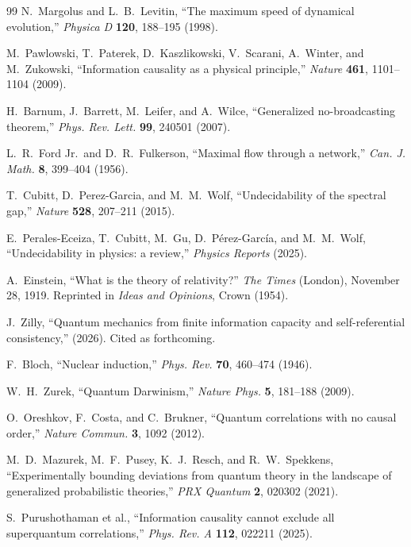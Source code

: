 \documentclass[12pt,a4paper]{article}
\theoremstyle{definition}
\theoremstyle{remark}
\begin{document}
\begin{thebibliography}{99}
N.~Margolus and L.~B.~Levitin, ``The maximum speed of dynamical evolution,'' \textit{Physica D} \textbf{120}, 188--195 (1998).

M.~Pawlowski, T.~Paterek, D.~Kaszlikowski, V.~Scarani, A.~Winter, and M.~Zukowski, ``Information causality as a physical principle,'' \textit{Nature} \textbf{461}, 1101--1104 (2009).

H.~Barnum, J.~Barrett, M.~Leifer, and A.~Wilce, ``Generalized no-broadcasting theorem,'' \textit{Phys. Rev. Lett.} \textbf{99}, 240501 (2007).

L.~R.~Ford Jr.\ and D.~R.~Fulkerson, ``Maximal flow through a network,'' \textit{Can. J. Math.} \textbf{8}, 399--404 (1956).

T.~Cubitt, D.~Perez-Garcia, and M.~M.~Wolf, ``Undecidability of the spectral gap,'' \textit{Nature} \textbf{528}, 207--211 (2015).

E.~Perales-Eceiza, T.~Cubitt, M.~Gu, D.~P\'erez-Garc\'ia, and M.~M.~Wolf, ``Undecidability in physics: a review,'' \textit{Physics Reports} (2025).

A.~Einstein, ``What is the theory of relativity?'' \textit{The Times} (London), November 28, 1919. Reprinted in \textit{Ideas and Opinions}, Crown (1954).

J.~Zilly, ``Quantum mechanics from finite information capacity and self-referential consistency,'' (2026). Cited as forthcoming.

F.~Bloch, ``Nuclear induction,'' \textit{Phys. Rev.} \textbf{70}, 460--474 (1946).

W.~H.~Zurek, ``Quantum Darwinism,'' \textit{Nature Phys.} \textbf{5}, 181--188 (2009).

O.~Oreshkov, F.~Costa, and C.~Brukner, ``Quantum correlations with no causal order,'' \textit{Nature Commun.} \textbf{3}, 1092 (2012).

M.~D.~Mazurek, M.~F.~Pusey, K.~J.~Resch, and R.~W.~Spekkens, ``Experimentally bounding deviations from quantum theory in the landscape of generalized probabilistic theories,'' \textit{PRX Quantum} \textbf{2}, 020302 (2021).

S.~Purushothaman et al., ``Information causality cannot exclude all superquantum correlations,'' \textit{Phys. Rev. A} \textbf{112}, 022211 (2025).


\end{thebibliography}
\end{document}
